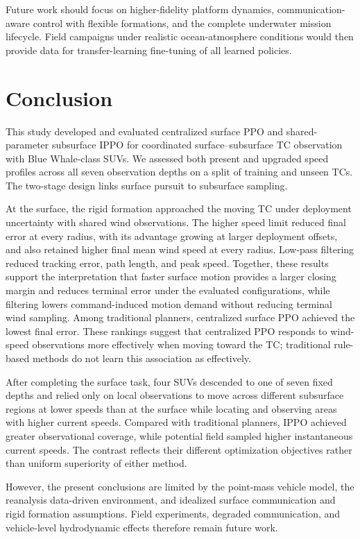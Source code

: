 \documentclass[a4paper,fleqn]{cas-dc}
\begin{document}
Future work should focus on higher-fidelity platform dynamics,
communication-aware control with flexible formations, and the complete
underwater mission lifecycle. Field campaigns under realistic ocean-atmosphere
conditions would then provide data for transfer-learning fine-tuning of all
learned policies.

\section{Conclusion}

This study developed and evaluated centralized surface PPO and
shared-parameter subsurface IPPO for coordinated surface--subsurface TC
observation with Blue Whale-class SUVs. We assessed both present and upgraded
speed profiles across all seven observation depths on a split of training and
unseen TCs. The two-stage design links surface pursuit to subsurface sampling.

At the surface, the rigid formation approached the moving TC under deployment
uncertainty with shared wind observations. The higher speed limit
reduced final error at every radius, with its advantage growing at larger
deployment offsets, and also retained higher final mean wind speed at every
radius.
Low-pass filtering reduced tracking error, path length, and peak speed.
Together, these results support the interpretation that faster surface motion
provides a larger closing margin and reduces terminal error under the evaluated
configurations, while filtering lowers command-induced motion demand without
reducing terminal wind sampling.
Among traditional planners, centralized surface PPO achieved the lowest final
error. These rankings suggest that centralized PPO responds to wind-speed
observations more effectively when moving toward the TC; traditional rule-based methods do
not learn this association as effectively.

After completing the surface task, four SUVs descended to one of
seven fixed depths and relied only on local observations to move across different
subsurface regions at lower speeds than at the surface while locating and
observing areas with higher current speeds. Compared with traditional planners,
IPPO achieved greater observational coverage, while potential field sampled
higher instantaneous current speeds. The contrast reflects their different
optimization objectives rather than uniform superiority of either method.

However, the present conclusions are limited by the point-mass vehicle model,
the reanalysis data-driven environment, and idealized surface communication and rigid
formation assumptions. Field experiments, degraded communication, and
vehicle-level hydrodynamic effects therefore remain future work.
\end{document}
